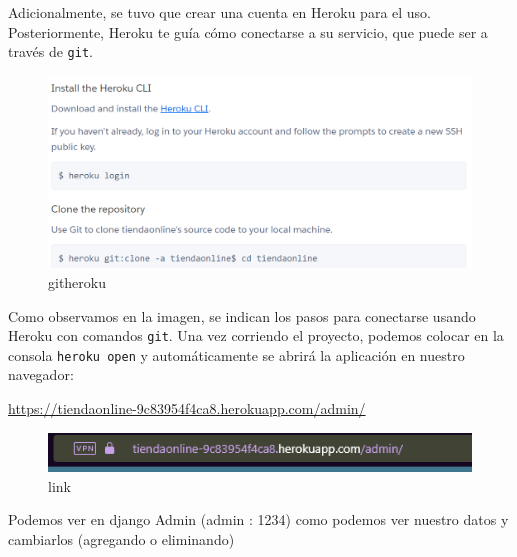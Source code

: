 \documentclass[conference]{IEEEtran}
\begin{document}
Adicionalmente, se tuvo que crear una cuenta en Heroku para el uso. Posteriormente, Heroku te guía cómo conectarse a su servicio, que puede ser a través de \texttt{git}.

\begin{figure}[htbp]
    \centering
    \includegraphics[width=\linewidth]{img/git.png}
    \caption{githeroku}
    \label{fig:etiqueta}
\end{figure}

Como observamos en la imagen, se indican los pasos para conectarse usando Heroku con comandos \texttt{git}. Una vez corriendo el proyecto, podemos colocar en la consola \texttt{heroku open} y automáticamente se abrirá la aplicación en nuestro navegador:

\url{https://tiendaonline-9c83954f4ca8.herokuapp.com/admin/}

\begin{figure}[htbp]
    \centering
    \includegraphics[width=\linewidth]{img/link.png}
    \caption{link}
    \label{fig:etiqueta}
\end{figure}

Podemos ver en django Admin (admin : 1234) como podemos ver nuestro datos y cambiarlos (agregando o eliminando) 
\end{document}
